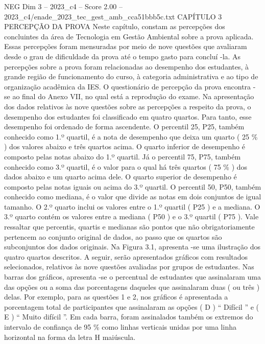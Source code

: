 \begin{textsample}{NEG Dim 3 – 2023\_c4 – Score 2.00 – 2023\_c4/enade\_2023\_tec\_gest\_amb\_cca51bbb5c.txt}  \label{ex:f3_neg_212}
CAPÍTULO 3 PERCEPÇÃO DA PROVA Neste capítulo, constam as percepções dos concluintes da área de Tecnologia em Gestão Ambiental sobre a prova aplicada.
Essas percepções foram mensuradas por meio de nove questões que avaliaram desde o grau de dificuldade da prova até o tempo gasto para concluí -la.
As percepções sobre a prova foram relacionadas ao desempenho dos estudantes, à grande região de funcionamento do curso, à categoria administrativa e ao tipo de organização acadêmica da IES.
O questionário de percepção da prova encontra -se ao final do Anexo VII, no qual está a reprodução do exame.
Na apresentação dos dados relativos às nove questões sobre as percepções a respeito da prova, o desempenho dos estudantes foi classificado em quatro quartos.
Para tanto, esse desempenho foi ordenado de forma ascendente.
O percentil 25, P25, também conhecido como 1.º quartil, é a nota de desempenho que deixa um quarto ( 25 \% ) dos valores abaixo e três quartos acima.
O quarto inferior de desempenho é composto pelas notas abaixo do 1.º quartil.
Já o percentil 75, P75, também conhecido como 3.º quartil, é o valor para o qual há três quartos ( 75 \% ) dos dados abaixo e um quarto acima dele.
O quarto superior de desempenho é composto pelas notas iguais ou acima do 3.º quartil.
O percentil 50, P50, também conhecido como mediana, é o valor que divide as notas em dois conjuntos de igual tamanho.
O 2.º quarto inclui os valores entre o 1.º quartil ( P25 ) e a mediana.
O 3.º quarto contém os valores entre a mediana ( P50 ) e o 3.º quartil ( P75 ).
Vale ressaltar que percentis, quartis e medianas são pontos que não obrigatoriamente pertencem ao conjunto original de dados, ao passo que os quartos são subconjuntos dos dados originais.
Na Figura 3.1, apresenta -se uma ilustração dos quatro quartos descritos.
A seguir, serão apresentados gráficos com resultados selecionados, relativos às nove questões avaliadas por grupos de estudantes.
Nas barras dos gráficos, apresenta -se o percentual de estudantes que assinalaram uma das opções ou a soma das porcentagens daqueles que assinalaram duas ( ou três ) delas.
Por exemplo, para as questões 1 e 2, nos gráficos é apresentada a porcentagem total de participantes que assinalaram as opções ( D ) “ Difícil ” e ( E ) “ Muito difícil ”.
Em cada barra, foram assinalados também os extremos do intervalo de confiança de 95 \% como linhas verticais unidas por uma linha horizontal na forma da letra H maiúscula.

\end{textsample}
